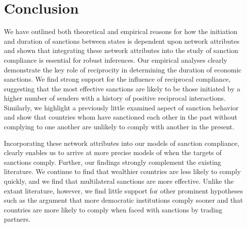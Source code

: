 \section*{Conclusion}
\label{conclusion}



We have outlined both theoretical and empirical reasons for how the initiation and duration of sanctions between states is dependent upon network attributes and shown that integrating these network attributes into the study of sanction compliance is essential for robust inferences. Our empirical analyses clearly demonstrate the key role of reciprocity in determining the duration of economic sanctions. We find strong support for the influence of reciprocal compliance, suggesting that the most effective sanctions are likely to be those initiated by a higher number of senders with a history of positive reciprocal interactions. Similarly, we highlight a previously little examined aspect of sanction behavior and show that countries whom have sanctioned each other in the past without complying to one another are unlikely to comply with another in the present. 

Incorporating these network attributes into our models of sanction compliance, clearly enables us to arrive at more precise models of when the targets of sanctions comply. Further, our findings strongly complement the existing literature. We continue to find that wealthier countries are less likely to comply quickly, and we find that multilateral sanctions are more effective. Unlike the extant literature, however, we find little support for other prominent hypotheses such as the argument that more democratic institutions comply sooner and that countries are more likely to comply when faced with sanctions by trading partners. 

